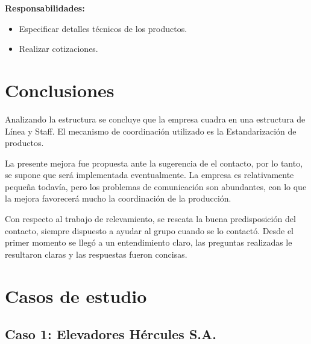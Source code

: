 \documentclass[a4paper,10pt]{article}
\begin{document}
		\textbf{Responsabilidades:}
		\begin{itemize}
			\item Especificar detalles técnicos de los productos.
			\item Realizar cotizaciones.
		\end{itemize}
\newpage
\section{Conclusiones}
Analizando la estructura se concluye que la empresa cuadra en una estructura de Línea y Staff. El mecanismo de coordinación utilizado es la Estandarización de productos.

La presente mejora fue propuesta ante la sugerencia de el contacto, por lo tanto, se supone que será
implementada eventualmente. La empresa es relativamente pequeña todavía, pero los problemas de comunicación
son abundantes, con lo que la mejora favorecerá mucho la coordinación de la producción.

Con respecto al trabajo de relevamiento, se rescata la buena predisposición del contacto, siempre
dispuesto a ayudar al grupo cuando se lo contactó. Desde el primer momento se llegó a un entendimiento
claro, las preguntas realizadas le resultaron claras y las respuestas fueron concisas.
\newpage
\section{Casos de estudio}
	\subsection{Caso 1: Elevadores Hércules S.A.}
\end{document}
